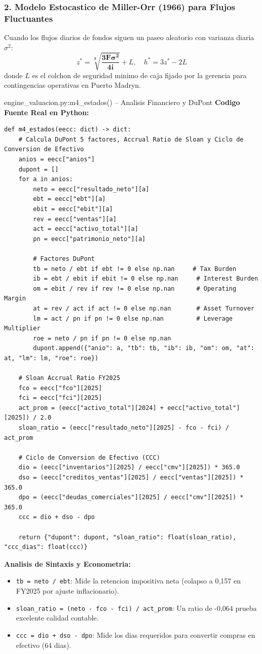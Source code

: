 \documentclass[10pt,a4paper]{article}
\theoremstyle{definition}
\begin{document}
\subsubsection{2. Modelo Estocastico de Miller-Orr (1966) para Flujos Fluctuantes}
Cuando los flujos diarios de fondos siguen un paseo aleatorio con varianza diaria $\sigma^2$:
\begin{equation}
z^* = \mathbf{\sqrt[3]{\frac{3F\sigma^2}{4i}}} + L, \quad h^* = 3z^* - 2L
\end{equation}
donde $L$ es el colchon de seguridad minimo de caja fijado por la gerencia para contingencias operativas en Puerto Madryn.

\begin{codebox}{{engine\_valuacion.py:m4\_estados() -- Analisis Financiero y DuPont}}
\textbf{Codigo Fuente Real en Python:}
\begin{verbatim}
def m4_estados(eecc: dict) -> dict:
    # Calcula DuPont 5 factores, Accrual Ratio de Sloan y Ciclo de Conversion de Efectivo
    anios = eecc["anios"]
    dupont = []
    for a in anios:
        neto = eecc["resultado_neto"][a]
        ebt = eecc["ebt"][a]
        ebit = eecc["ebit"][a]
        rev = eecc["ventas"][a]
        act = eecc["activo_total"][a]
        pn = eecc["patrimonio_neto"][a]
        
        # Factores DuPont
        tb = neto / ebt if ebt != 0 else np.nan     # Tax Burden
        ib = ebt / ebit if ebit != 0 else np.nan     # Interest Burden
        om = ebit / rev if rev != 0 else np.nan      # Operating Margin
        at = rev / act if act != 0 else np.nan       # Asset Turnover
        lm = act / pn if pn != 0 else np.nan         # Leverage Multiplier
        roe = neto / pn if pn != 0 else np.nan
        dupont.append({"anio": a, "tb": tb, "ib": ib, "om": om, "at": at, "lm": lm, "roe": roe})
    
    # Sloan Accrual Ratio FY2025
    fco = eecc["fco"][2025]
    fci = eecc["fci"][2025]
    act_prom = (eecc["activo_total"][2024] + eecc["activo_total"][2025]) / 2.0
    sloan_ratio = (eecc["resultado_neto"][2025] - fco - fci) / act_prom
    
    # Ciclo de Conversion de Efectivo (CCC)
    dio = (eecc["inventarios"][2025] / eecc["cmv"][2025]) * 365.0
    dso = (eecc["creditos_ventas"][2025] / eecc["ventas"][2025]) * 365.0
    dpo = (eecc["deudas_comerciales"][2025] / eecc["cmv"][2025]) * 365.0
    ccc = dio + dso - dpo
    
    return {"dupont": dupont, "sloan_ratio": float(sloan_ratio), "ccc_dias": float(ccc)}
\end{verbatim}
\textbf{Analisis de Sintaxis y Econometria:}
\begin{itemize}
    \item \texttt{tb = neto / ebt}: Mide la retencion impositiva neta (colapso a 0,157 en FY2025 por ajuste inflacionario).
    \item \texttt{sloan\_ratio = (neto - fco - fci) / act\_prom}: Un ratio de -0,064 prueba excelente calidad contable.
    \item \texttt{ccc = dio + dso - dpo}: Mide los dias requeridos para convertir compras en efectivo (64 dias).
\end{itemize}
\end{codebox}
\end{document}
